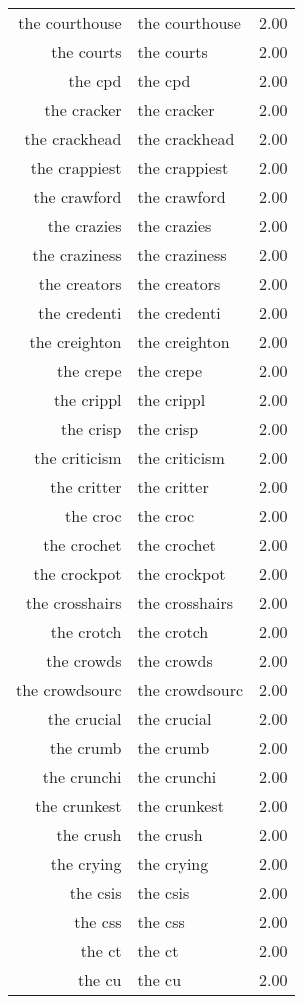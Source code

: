 \begin{table}[ht]
\begin{tabular}{rlr}
  the courthouse & the courthouse & 2.00 \\ 
  the courts & the courts & 2.00 \\ 
  the cpd & the cpd & 2.00 \\ 
  the cracker & the cracker & 2.00 \\ 
  the crackhead & the crackhead & 2.00 \\ 
  the crappiest & the crappiest & 2.00 \\ 
  the crawford & the crawford & 2.00 \\ 
  the crazies & the crazies & 2.00 \\ 
  the craziness & the craziness & 2.00 \\ 
  the creators & the creators & 2.00 \\ 
  the credenti & the credenti & 2.00 \\ 
  the creighton & the creighton & 2.00 \\ 
  the crepe & the crepe & 2.00 \\ 
  the crippl & the crippl & 2.00 \\ 
  the crisp & the crisp & 2.00 \\ 
  the criticism & the criticism & 2.00 \\ 
  the critter & the critter & 2.00 \\ 
  the croc & the croc & 2.00 \\ 
  the crochet & the crochet & 2.00 \\ 
  the crockpot & the crockpot & 2.00 \\ 
  the crosshairs & the crosshairs & 2.00 \\ 
  the crotch & the crotch & 2.00 \\ 
  the crowds & the crowds & 2.00 \\ 
  the crowdsourc & the crowdsourc & 2.00 \\ 
  the crucial & the crucial & 2.00 \\ 
  the crumb & the crumb & 2.00 \\ 
  the crunchi & the crunchi & 2.00 \\ 
  the crunkest & the crunkest & 2.00 \\ 
  the crush & the crush & 2.00 \\ 
  the crying & the crying & 2.00 \\ 
  the csis & the csis & 2.00 \\ 
  the css & the css & 2.00 \\ 
  the ct & the ct & 2.00 \\ 
  the cu & the cu & 2.00 \\ 

\end{tabular}
\end{table}
